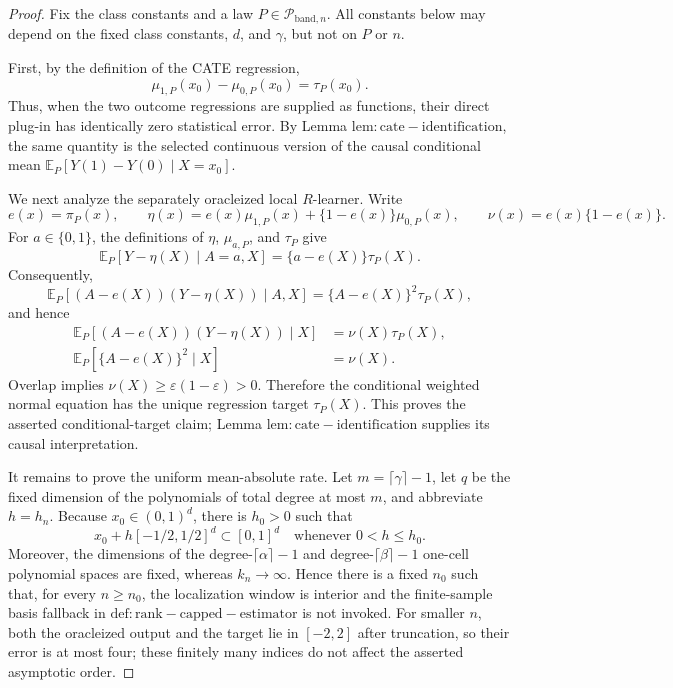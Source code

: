 \begin{proof}
Fix the class constants and a law \(P\in\mathcal P_{\mathrm{band},n}\).  All constants below may depend on the fixed class constants, \(d\), and \(\gamma\), but not on \(P\) or \(n\).

First, by the definition of the CATE regression,
\[
\mu_{1,P}(x_0)-\mu_{0,P}(x_0)=\tau_P(x_0).
\]
Thus, when the two outcome regressions are supplied as functions, their direct plug-in has identically zero statistical error.  By Lemma \(\mathrm{lem:cate-identification}\), the same quantity is the selected continuous version of the causal conditional mean \(\mathbb E_P[Y(1)-Y(0)\mid X=x_0]\).

We next analyze the separately oracleized local \(R\)-learner.  Write
\[
e(x)=\pi_P(x),\qquad
\eta(x)=e(x)\mu_{1,P}(x)+\{1-e(x)\}\mu_{0,P}(x),
\qquad
\nu(x)=e(x)\{1-e(x)\}.
\]
For \(a\in\{0,1\}\), the definitions of \(\eta\), \(\mu_{a,P}\), and \(\tau_P\) give
\[
\mathbb E_P[Y-\eta(X)\mid A=a,X]
=\{a-e(X)\}\tau_P(X).
\]
Consequently,
\[
\mathbb E_P\!\left[(A-e(X))(Y-\eta(X))\mid A,X\right]
=\{A-e(X)\}^2\tau_P(X),
\]
and hence
\[
\begin{aligned}
\mathbb E_P[(A-e(X))(Y-\eta(X))\mid X]
&=\nu(X)\tau_P(X),\\
\mathbb E_P[\{A-e(X)\}^2\mid X]&=\nu(X).
\end{aligned}
\]
Overlap implies \(\nu(X)\geq\varepsilon(1-\varepsilon)>0\).  Therefore the conditional weighted normal equation has the unique regression target \(\tau_P(X)\).  This proves the asserted conditional-target claim; Lemma \(\mathrm{lem:cate-identification}\) supplies its causal interpretation.

It remains to prove the uniform mean-absolute rate.  Let \(m=\lceil\gamma\rceil-1\), let \(q\) be the fixed dimension of the polynomials of total degree at most \(m\), and abbreviate \(h=h_n\).  Because \(x_0\in(0,1)^d\), there is \(h_0>0\) such that
\[
x_0+h[-1/2,1/2]^d\subset[0,1]^d
\quad\text{whenever }0<h\leq h_0.
\]
Moreover, the dimensions of the degree-\(\lceil\alpha\rceil-1\) and degree-\(\lceil\beta\rceil-1\) one-cell polynomial spaces are fixed, whereas \(k_n\to\infty\).  Hence there is a fixed \(n_0\) such that, for every \(n\geq n_0\), the localization window is interior and the finite-sample basis fallback in \(\mathrm{def:rank-capped-estimator}\) is not invoked.  For smaller \(n\), both the oracleized output and the target lie in \([-2,2]\) after truncation, so their error is at most four; these finitely many indices do not affect the asserted asymptotic order.


\end{proof}
